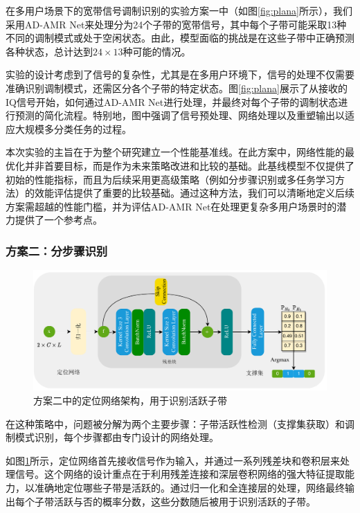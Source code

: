 在多用户场景下的宽带信号调制识别的实验方案一中（如图\ref{fig:plana}所示），我们采用AD-AMR Net来处理分为24个子带的宽带信号，其中每个子带可能采取13种不同的调制模式或处于空闲状态。由此，模型面临的挑战是在这些子带中正确预测各种状态，总计达到\(24 \times 13\)种可能的情况。

实验的设计考虑到了信号的复杂性，尤其是在多用户环境下，信号的处理不仅需要准确识别调制模式，还需区分各个子带的特定状态。图\ref{fig:plana}展示了从接收的IQ信号开始，如何通过AD-AMR Net进行处理，并最终对每个子带的调制状态进行预测的简化流程。特别地，图中强调了信号预处理、网络处理以及重塑输出以适应大规模多分类任务的过程。

本次实验的主旨在于为整个研究建立一个性能基准线。在此方案中，网络性能的最优化并非首要目标，而是作为未来策略改进和比较的基础。此基线模型不仅提供了初始的性能指标，而且为后续采用更高级策略（例如分步骤识别或多任务学习方法）的效能评估提供了重要的比较基础。通过这种方法，我们可以清晰地定义后续方案需超越的性能门槛，并为评估AD-AMR Net在处理更复杂多用户场景时的潜力提供了一个参考点。


\subsubsection{方案二：分步骤识别}\label{sec:background}

\begin{figure}
    \centering
    \includegraphics[width=\textwidth]{Image/localization.pdf}
    \caption{方案二中的定位网络架构，用于识别活跃子带}
    \label{fig:planb_localization}
\end{figure}

在这种策略中，问题被分解为两个主要步骤：子带活跃性检测（支撑集获取）和调制模式识别，每个步骤都由专门设计的网络处理。

如图\ref{fig:planb_localization}所示，定位网络首先接收信号作为输入，并通过一系列残差块和卷积层来处理信号。这个网络的设计重点在于利用残差连接和深层卷积网络的强大特征提取能力，以准确地定位哪些子带是活跃的。通过归一化和全连接层的处理，网络最终输出每个子带活跃与否的概率分数，这些分数随后被用于识别活跃的子带。

